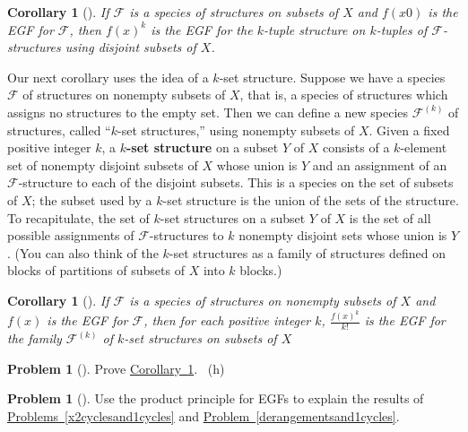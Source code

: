 \documentclass[10pt,]{book}
\newcommand{\terminology}[1]{\textbf{#1}}
\theoremstyle{plain}
\newtheorem{corollary}[theorem]{Corollary}
\theoremstyle{definition}
\newtheorem{activity}[project]{Problem}
\theoremstyle{definition}
\numberwithin{equation}{chapter}
\newcommand{\F}{\mathcal{F}}
\begin{document}
\begin{corollary}[{}]\label{fspeciescorollary1}
\hypertarget{p-2133}{}%
If \(\F\) is a species of structures on subsets of \(X\) and \(f(x0)\) is the EGF for \(\F\), then \(f(x)^k\) is the EGF for the \(k\)-tuple structure on \(k\)-tuples of \(\F\)-structures using disjoint subsets of \(X\).%
\end{corollary}
\hypertarget{p-2134}{}%
Our next corollary uses the idea of a \(k\)-set structure. Suppose we have a species \(\F\) of structures on nonempty subsets of \(X\), that is, a species of structures which assigns no structures to the empty set. Then we can define a new species \(\F^{(k)}\) of structures, called ``\(k\)-set structures,'' using nonempty subsets of \(X\). Given a fixed positive integer \(k\), a \terminology{\(k\)-set structure} on a subset \(Y\) of \(X\) consists of a \(k\)-element set of nonempty disjoint subsets of \(X\) whose union is \(Y\) and an assignment of an \(\F\)-structure to each of the disjoint subsets. This is a species on the set of subsets of \(X\); the subset used by a \(k\)-set structure is the union of the sets of the structure. To recapitulate, the set of \(k\)-set structures on a subset \(Y\) of \(X\) is the set of all possible assignments of \(\F\)-structures to \(k\) nonempty disjoint sets whose union is \(Y\). (You can also think of the \(k\)-set structures as a family of structures defined on blocks of partitions of subsets of \(X\) into \(k\) blocks.)%
\begin{corollary}[{}]\label{fspeciescorollary2}
\hypertarget{p-2135}{}%
If \(\F\) is a species of structures on nonempty subsets of \(X\) and \(f(x)\) is the EGF for \(\F\), then for each positive integer \(k\), \(\frac{f(x)^k}{k!}\) is the EGF for the family \(\F^{(k)}\) of \(k\)-set structures on subsets of \(X\)%
\end{corollary}
\begin{activity}[]\marginsymbol[-1em]{} \label{activity-399}
\hypertarget{p-2136}{}%
Prove \hyperref[fspeciescorollary2]{Corollary~\ref{fspeciescorollary2}}.%
~{\tiny (h)}\end{activity}
\begin{activity}[] \label{activity-400}
\hypertarget{p-2139}{}%
Use the product principle for EGFs to explain the results of \hyperref[x2cyclesand1cycles]{Problems~\ref{x2cyclesand1cycles}} and \hyperref[derangementsand1cycles]{Problem~\ref{derangementsand1cycles}}.%
\end{activity}
\end{document}
